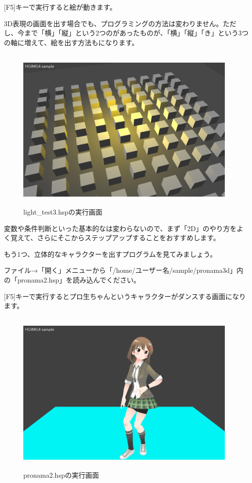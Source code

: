 [F5]キーで実行すると絵が動きます。

3D表現の画面を出す場合でも、プログラミングの方法は変わりません。ただし、今まで「横」「縦」という2つのがあったものが、「横」「縦」「き」という3つの軸に増えて、絵を出す方法もになります。

\begin{figure}[H]
    \begin{center}
      \includegraphics[keepaspectratio,width=10.971cm,height=8.229cm]{text04-img/s_lighttest3.png}
      \caption{light\_test3.hspの実行画面}
    \end{center}
    \label{fig:prog_menu}
\end{figure}


変数や条件判断といった基本的なは変わらないので、まず「2D」のやり方をよく覚えて、さらにそこからステップアップすることをおすすめします。

もう1つ、立体的なキャラクターを出すプログラムを見てみましょう。


ファイル→「開く」メニューから「/home/ユーザー名/sample/pronama3d」内の「pronama2.hsp」を読み込んでください。

[F5]キーで実行するとプロ生ちゃんというキャラクターがダンスする画面になります。


\begin{figure}[H]
    \begin{center}
      \includegraphics[keepaspectratio,width=10.971cm,height=8.229cm]{text04-img/s_pronama2.png}
      \caption{pronama2.hspの実行画面}
    \end{center}
    \label{fig:prog_menu}
\end{figure}

